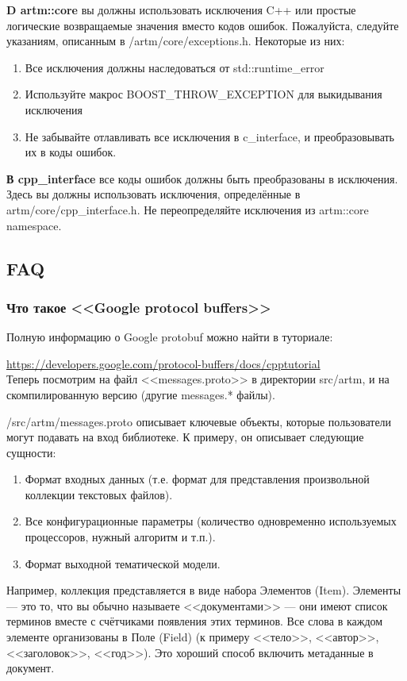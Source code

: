 \documentclass[12pt]{article}
\begin{document}
\textbf{D artm::core} вы должны использовать исключения C++ 
или простые логические возвращаемые значения вместо кодов ошибок.
Пожалуйста, следуйте указаниям, описанным в /artm/core/exceptions.h.
Некоторые из них:
\begin{enumerate}
    \item Все исключения должны наследоваться от std::runtime\_error
    \item Используйте макрос BOOST\_THROW\_EXCEPTION для выкидывания исключения
    \item Не забывайте отлавливать все исключения в c\_interface, и преобразовывать их в коды ошибок.
\end{enumerate}

\textbf{В cpp\_interface} все коды ошибок должны быть преобразованы в исключения.
Здесь вы должны использовать исключения, определённые в artm/core/cpp\_interface.h. Не переопределяйте исключения из artm::core namespace.

\subsection{FAQ}
\subsubsection{Что такое <<Google protocol buffers>>}
Полную информацию о Google protobuf можно найти в туториале:

\url{https://developers.google.com/protocol-buffers/docs/cpptutorial} \\

Теперь посмотрим на файл <<messages.proto>> в директории src/artm, и на скомпилированную версию (другие messages.* файлы).

/src/artm/messages.proto описывает ключевые объекты, которые пользователи могут подавать на вход библиотеке. К примеру, он описывает следующие сущности:

\begin{enumerate}
	\item Формат входных данных (т.е. формат для представления произвольной коллекции текстовых файлов).
	\item Все конфигурационные параметры (количество одновременно используемых процессоров, нужный алгоритм и т.п.).
	\item Формат выходной тематической модели.
\end{enumerate}

Например, коллекция представляется в виде набора Элементов (Item). Элементы --- это то, что вы обычно называете <<документами>> --- они имеют список терминов вместе с счётчиками появления этих терминов. Все слова в каждом элементе организованы в Поле (Field) (к примеру <<тело>>, <<автор>>, <<заголовок>>, <<год>>). Это хороший способ включить метаданные в документ.
\end{document}
